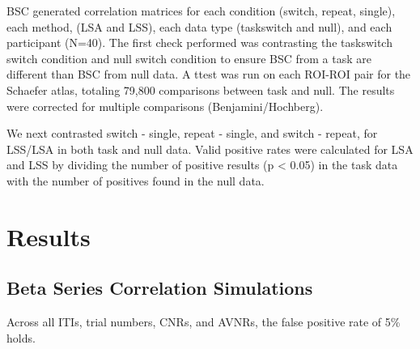 \documentclass[10pt,letterpaper]{article}
\begin{document}
BSC generated correlation matrices for each condition (switch, repeat, single),
each method, (LSA and LSS), each data type (taskswitch and null), and each participant (N=40).
The first check performed was contrasting the taskswitch switch condition and null switch condition
to ensure BSC from a task are different than BSC from null data.
A ttest was run on each ROI-ROI pair for the Schaefer atlas, totaling 79,800 comparisons
between task and null.
The results were corrected for multiple comparisons (Benjamini/Hochberg).


We next contrasted switch - single, repeat - single, and switch - repeat, for LSS/LSA in both
task and null data.
Valid positive rates were calculated for LSA and LSS by dividing the number of positive results (p < 0.05)
in the task data with the number of positives found in the null data.




\section*{Results}

\subsection*{Beta Series Correlation Simulations}

Across all ITIs, trial numbers, CNRs, and AVNRs, the false positive rate of 5\%
holds.
\end{document}

